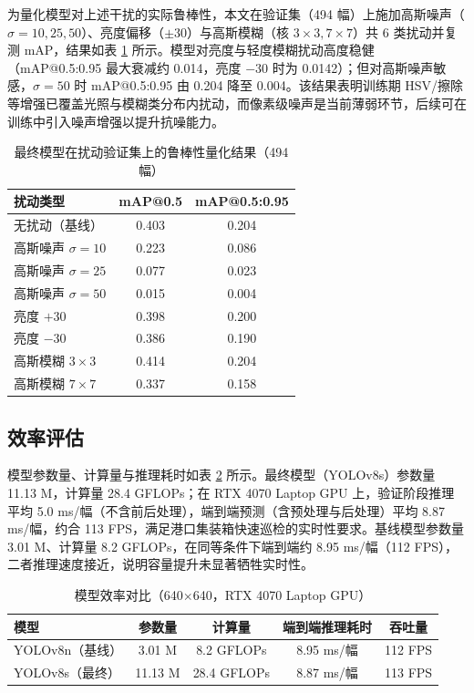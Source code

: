 为量化模型对上述干扰的实际鲁棒性，本文在验证集（494 幅）上施加高斯噪声（$\sigma=10,25,50$）、亮度偏移（$\pm30$）与高斯模糊（核 $3\times3,7\times7$）共 6 类扰动并复测 mAP，结果如表 \ref{tab:robustness} 所示。模型对亮度与轻度模糊扰动高度稳健（mAP@0.5:0.95 最大衰减约 0.014，亮度 $-30$ 时为 0.0142）；但对高斯噪声敏感，$\sigma=50$ 时 mAP@0.5:0.95 由 0.204 降至 0.004。该结果表明训练期 HSV/擦除等增强已覆盖光照与模糊类分布内扰动，而像素级噪声是当前薄弱环节，后续可在训练中引入噪声增强以提升抗噪能力。

\begin{table}[H]
\centering
{}
\caption{最终模型在扰动验证集上的鲁棒性量化结果（494 幅）}\label{tab:robustness}
\begin{tabular}{lcc}
  \toprule
  扰动类型 & mAP@0.5 & mAP@0.5:0.95 \\
  \midrule
  无扰动（基线） & 0.403 & 0.204 \\
  高斯噪声 $\sigma=10$ & 0.223 & 0.086 \\
  高斯噪声 $\sigma=25$ & 0.077 & 0.023 \\
  高斯噪声 $\sigma=50$ & 0.015 & 0.004 \\
  亮度 $+30$ & 0.398 & 0.200 \\
  亮度 $-30$ & 0.386 & 0.190 \\
  高斯模糊 $3\times3$ & 0.414 & 0.204 \\
  高斯模糊 $7\times7$ & 0.337 & 0.158 \\
  \bottomrule
\end{tabular}
\end{table}

\subsection{效率评估}

模型参数量、计算量与推理耗时如表 \ref{tab:efficiency} 所示。最终模型（YOLOv8s）参数量 11.13 M，计算量 28.4 GFLOPs；在 RTX 4070 Laptop GPU 上，验证阶段推理平均 5.0 ms/幅（不含前后处理），端到端预测（含预处理与后处理）平均 8.87 ms/幅，约合 113 FPS，满足港口集装箱快速巡检的实时性要求。基线模型参数量 3.01 M、计算量 8.2 GFLOPs，在同等条件下端到端约 8.95 ms/幅（112 FPS），二者推理速度接近，说明容量提升未显著牺牲实时性。

\begin{table}[H]
\centering
{}
\caption{模型效率对比（640$\times$640，RTX 4070 Laptop GPU）}\label{tab:efficiency}
\begin{tabular}{lcccc}
  \toprule
  模型 & 参数量 & 计算量 & 端到端推理耗时 & 吞吐量 \\
  \midrule
  YOLOv8n（基线） & 3.01 M & 8.2 GFLOPs & 8.95 ms/幅 & 112 FPS \\
  YOLOv8s（最终） & 11.13 M & 28.4 GFLOPs & 8.87 ms/幅 & 113 FPS \\
  \bottomrule
\end{tabular}
\end{table}


